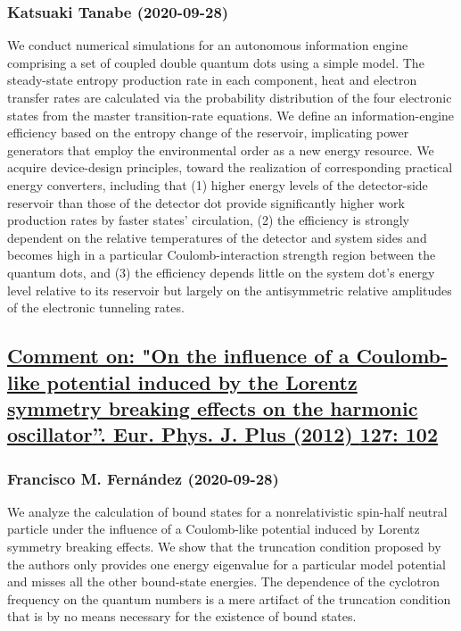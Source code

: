 \subsubsection*{Katsuaki Tanabe (2020-09-28)}
We conduct numerical simulations for an autonomous information engine
comprising a set of coupled double quantum dots using a simple model. The
steady-state entropy production rate in each component, heat and electron
transfer rates are calculated via the probability distribution of the four
electronic states from the master transition-rate equations. We define an
information-engine efficiency based on the entropy change of the reservoir,
implicating power generators that employ the environmental order as a new
energy resource. We acquire device-design principles, toward the realization of
corresponding practical energy converters, including that (1) higher energy
levels of the detector-side reservoir than those of the detector dot provide
significantly higher work production rates by faster states' circulation, (2)
the efficiency is strongly dependent on the relative temperatures of the
detector and system sides and becomes high in a particular Coulomb-interaction
strength region between the quantum dots, and (3) the efficiency depends little
on the system dot's energy level relative to its reservoir but largely on the
antisymmetric relative amplitudes of the electronic tunneling rates.

\subsection*{\href{http://arxiv.org/abs/2009.13351v1}{Comment on: "On the influence of a Coulomb-like potential induced by the  Lorentz symmetry breaking effects on the harmonic oscillator''. Eur. Phys. J.  Plus (2012) \textbf{127}: 102}}
\subsubsection*{Francisco M. Fernández (2020-09-28)}
We analyze the calculation of bound states for a nonrelativistic spin-half
neutral particle under the influence of a Coulomb-like potential induced by
Lorentz symmetry breaking effects. We show that the truncation condition
proposed by the authors only provides one energy eigenvalue for a particular
model potential and misses all the other bound-state energies. The dependence
of the cyclotron frequency on the quantum numbers is a mere artifact of the
truncation condition that is by no means necessary for the existence of bound
states.

